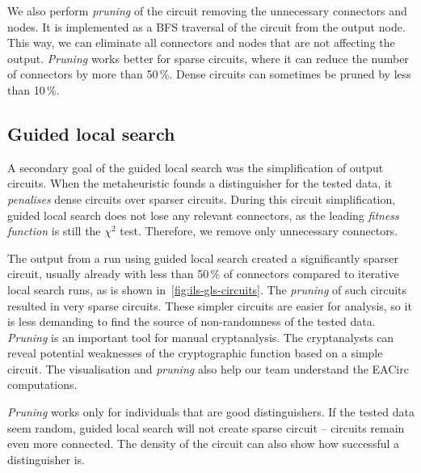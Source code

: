 \documentclass[
    digital,    %
    oneside,    %
    color,
    11pt,
    nocover,
    notable,
    nolof,
    nolot,
]{fithesis3}
\begin{document}
We also perform \textit{pruning} of the circuit removing the unnecessary connectors and nodes. It is implemented as a BFS traversal of the circuit from the output node. This way, we can eliminate all connectors and nodes that are not affecting the output. \textit{Pruning} works better for sparse circuits, where it can reduce the number of connectors by more than 50\,\%. Dense circuits can sometimes be pruned by less than 10\,\%.

\subsection{Guided local search}
\label{subsec:res-circ-anal-gls}

A secondary goal of the guided local search was the simplification of output circuits. When the metaheuristic founds a distinguisher for the tested data, it \textit{penalises} dense circuits over sparser circuits. During this circuit simplification, guided local search does not lose any relevant connectors, as the leading \textit{fitness function} is still the $\chi^{2}$ test. Therefore, we remove only unnecessary connectors.

The output from a run using guided local search created a significantly sparser circuit, usually already with less than 50\,\% of connectors compared to iterative local search runs, as is shown in~\cref{fig:ils-gls-circuits}. The \textit{pruning} of such circuits resulted in very sparse circuits. These simpler circuits are easier for analysis, so it is less demanding to find the source of non-randomness of the tested data. \textit{Pruning} is an important tool for manual cryptanalysis. The cryptanalysts can reveal potential weaknesses of the cryptographic function based on a simple circuit. The visualisation and \textit{pruning} also help our team understand the EACirc computations.

\textit{Pruning} works only for individuals that are good distinguishers. If the tested data seem random, guided local search will not create sparse circuit -- circuits remain even more connected. The density of the circuit can also show how successful a distinguisher is.
\end{document}
